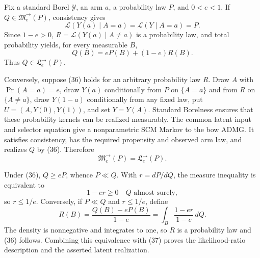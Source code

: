 Fix a standard Borel \(\mathcal Y\), an arm \(a\), a probability law \(P\), and \(0<e<1\).  If \(Q\in\mathfrak M^{\to}_e(P)\), consistency gives
\[
 \mathcal L(Y(a)\mid A=a)=\mathcal L(Y\mid A=a)=P.
\]
Since \(1-e>0\), \(R=\mathcal L(Y(a)\mid A\ne a)\) is a probability law, and total probability yields, for every measurable \(B\),
\[
 Q(B)=eP(B)+(1-e)R(B). \tag{36}
\]
Thus \(Q\in\mathfrak L^{\to}_e(P)\).

Conversely, suppose (36) holds for an arbitrary probability law \(R\).  Draw \(A\) with \(\Pr(A=a)=e\), draw \(Y(a)\) conditionally from \(P\) on \(\{A=a\}\) and from \(R\) on \(\{A\ne a\}\), draw \(Y(1-a)\) conditionally from any fixed law, put \(U=(A,Y(0),Y(1))\), and set \(Y=Y(A)\).  Standard Borelness ensures that these probability kernels can be realized measurably.  The common latent input and selector equation give a nonparametric SCM Markov to the bow ADMG.  It satisfies consistency, has the required propensity and observed arm law, and realizes \(Q\) by (36).  Therefore
\[
 \mathfrak M^{\to}_e(P)=\mathfrak L^{\to}_e(P). \tag{37}
\]

Under (36), \(Q\ge eP\), whence \(P\ll Q\).  With \(r=dP/dQ\), the measure inequality is equivalent to
\[
 1-er\ge0\quad Q\text{-almost surely},
\]
so \(r\le1/e\).  Conversely, if \(P\ll Q\) and \(r\le1/e\), define
\[
 R(B)=\frac{Q(B)-eP(B)}{1-e}
     =\int_B\frac{1-er}{1-e}\,dQ.
\]
The density is nonnegative and integrates to one, so \(R\) is a probability law and (36) follows.  Combining this equivalence with (37) proves the likelihood-ratio description and the asserted latent realization.